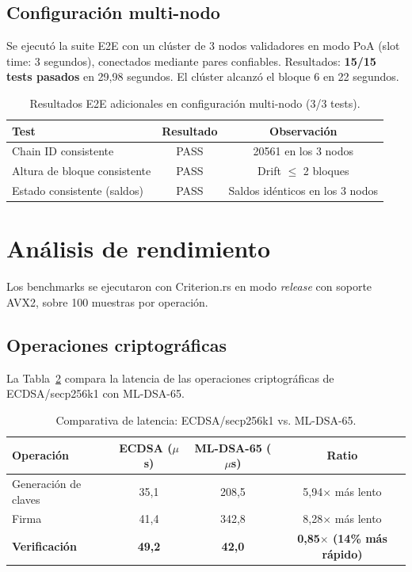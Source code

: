 \subsection{Configuración multi-nodo}

Se ejecutó la suite E2E con un clúster de 3 nodos validadores en modo PoA (slot time: 3 segundos), conectados mediante pares confiables. Resultados: \textbf{15/15 tests pasados} en 29,98 segundos. El clúster alcanzó el bloque 6 en 22 segundos.

\begin{table}[htbp]
\centering
\caption{Resultados E2E adicionales en configuración multi-nodo (3/3 tests).}
\label{tab:e2e_multi}
\begin{tabular}{@{}lcc@{}}
\toprule
\textbf{Test} & \textbf{Resultado} & \textbf{Observación} \\
\midrule
Chain ID consistente & PASS & 20561 en los 3 nodos \\
Altura de bloque consistente & PASS & Drift $\leq$ 2 bloques \\
Estado consistente (saldos) & PASS & Saldos idénticos en los 3 nodos \\
\bottomrule
\end{tabular}
\end{table}


\section{Análisis de rendimiento}
\label{sec:res_performance}

Los benchmarks se ejecutaron con Criterion.rs en modo \emph{release} con soporte AVX2, sobre 100 muestras por operación.

\subsection{Operaciones criptográficas}

La Tabla~\ref{tab:crypto_bench} compara la latencia de las operaciones criptográficas de ECDSA/secp256k1 con ML-DSA-65.

\begin{table}[htbp]
\centering
\caption{Comparativa de latencia: ECDSA/secp256k1 vs. ML-DSA-65.}
\label{tab:crypto_bench}
\begin{tabular}{@{}lccc@{}}
\toprule
\textbf{Operación} & \textbf{ECDSA ($\mu$s)} & \textbf{ML-DSA-65 ($\mu$s)} & \textbf{Ratio} \\
\midrule
Generación de claves & 35,1 & 208,5 & 5,94$\times$ más lento \\
Firma & 41,4 & 342,8 & 8,28$\times$ más lento \\
\textbf{Verificación} & \textbf{49,2} & \textbf{42,0} & \textbf{0,85$\times$ (14\% más rápido)} \\
\bottomrule
\end{tabular}
\end{table}


